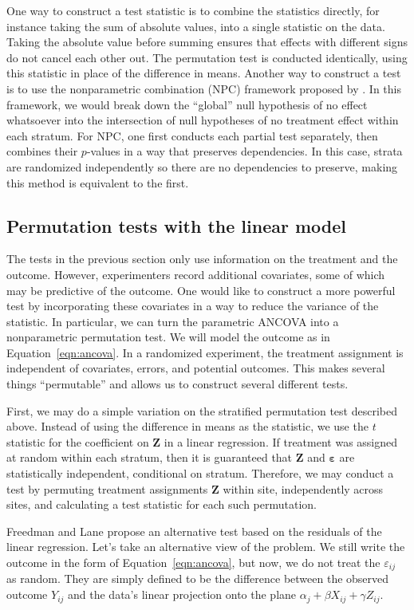 \documentclass[11pt]{article}
\begin{document}
One way to construct a test statistic is to combine the statistics directly, for instance taking the sum of absolute values, into a single statistic on the data.
Taking the absolute value before summing ensures that effects with different signs do not cancel each other out.
The permutation test is conducted identically, using this statistic in place of the difference in means.
Another way to construct a test is to use the nonparametric combination (NPC) framework proposed by \cite{pesarin_permutation_2010}.
In this framework, we would break down the ``global'' null hypothesis of no effect whatsoever into the intersection of null hypotheses of no treatment effect within each stratum.
For NPC, one first conducts each partial test separately, then combines their $p$-values in a way that preserves dependencies.
In this case, strata are randomized independently so there are no dependencies to preserve, making this method is equivalent to the first.


\subsection*{Permutation tests with the linear model}
The tests in the previous section only use information on the treatment and the outcome.
However, experimenters record additional covariates, some of which may be predictive of the outcome.
One would like to construct a more powerful test by incorporating these covariates in a way to reduce the variance of the statistic.
In particular, we can turn the parametric ANCOVA into a nonparametric permutation test.
We will model the outcome as in Equation~\ref{eqn:ancova}.
In a randomized experiment, the treatment assignment is independent of covariates, errors, and potential outcomes.
This makes several things ``permutable'' and allows us to construct several different tests.

First, we may do a simple variation on the stratified permutation test described above.
Instead of using the difference in means as the statistic, we use the $t$ statistic for the coefficient on $\mathbf{Z}$ in a linear regression.
If treatment was assigned at random within each stratum, then it is guaranteed that $\mathbf{Z}$ and $\mathbf{\varepsilon}$ are statistically independent, conditional on stratum.
Therefore, we may conduct a test by permuting treatment assignments $\mathbf{Z}$ within site, independently across sites, and calculating a test statistic for each such permutation.

Freedman and Lane \cite{freedman_nonstochastic_1983} propose an alternative test based on the residuals of the linear regression.
Let's take an alternative view of the problem.
We still write the outcome in the form of Equation~\ref{eqn:ancova}, but now, we do not treat the $\varepsilon_{ij}$ as random.
They are simply defined to be the difference between the observed outcome $Y_{ij}$ and the data's linear projection onto the plane $\alpha_j + \beta X_{ij}+ \gamma Z_{ij}$.
\end{document}
